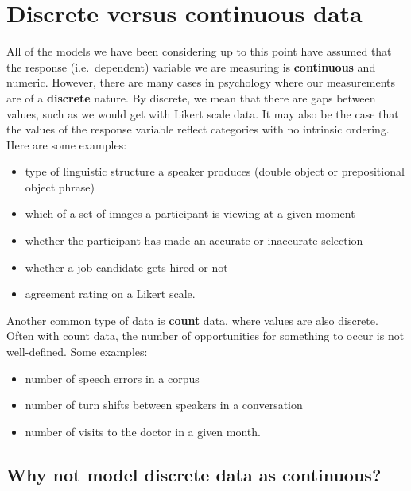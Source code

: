 \documentclass[]{book}
\providecommand{\tightlist}{%
  \setlength{\itemsep}{0pt}\setlength{\parskip}{0pt}}
\begin{document}
\hypertarget{discrete-versus-continuous-data}{%
\section{Discrete versus continuous data}\label{discrete-versus-continuous-data}}

All of the models we have been considering up to this point have assumed that the response (i.e.~dependent) variable we are measuring is \textbf{continuous} and numeric. However, there are many cases in psychology where our measurements are of a \textbf{discrete} nature. By discrete, we mean that there are gaps between values, such as we would get with Likert scale data. It may also be the case that the values of the response variable reflect categories with no intrinsic ordering. Here are some examples:

\begin{itemize}
\tightlist
\item
  type of linguistic structure a speaker produces (double object or prepositional object phrase)
\item
  which of a set of images a participant is viewing at a given moment
\item
  whether the participant has made an accurate or inaccurate selection
\item
  whether a job candidate gets hired or not
\item
  agreement rating on a Likert scale.
\end{itemize}

Another common type of data is \textbf{count} data, where values are also discrete. Often with count data, the number of opportunities for something to occur is not well-defined. Some examples:

\begin{itemize}
\tightlist
\item
  number of speech errors in a corpus
\item
  number of turn shifts between speakers in a conversation
\item
  number of visits to the doctor in a given month.
\end{itemize}

\hypertarget{why-not-model-discrete-data-as-continuous}{%
\subsection{Why not model discrete data as continuous?}\label{why-not-model-discrete-data-as-continuous}}
\end{document}
